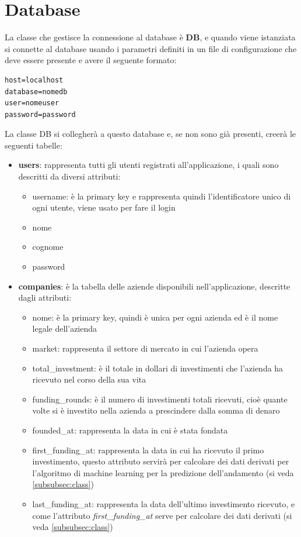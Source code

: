 \section{Database}
La classe che gestisce la connessione al database è \textbf{DB}, e quando viene istanziata si connette al database usando i parametri definiti in un file di configurazione che deve essere presente e avere il seguente formato:
\newpage
\begin{verbatim}
host=localhost
database=nomedb
user=nomeuser
password=password
\end{verbatim}
La classe DB si collegherà a questo database e, se non sono già presenti, creerà le seguenti tabelle:
\begin{itemize}
\item \textbf{users}: rappresenta tutti gli utenti registrati all'applicazione, i quali sono descritti da diversi attributi:
\begin{itemize}
\item username: è la primary key e rappresenta quindi l'identificatore unico di ogni utente, viene usato per fare il login
\item nome
\item cognome
\item password
\end{itemize}
\item \textbf{companies}: è la tabella delle aziende disponibili nell'applicazione, descritte dagli attributi:
\begin{itemize}
\item nome: è la primary key, quindi è unica per ogni azienda ed è il nome legale dell'azienda
\item market: rappresenta il settore di mercato in cui l'azienda opera
\item total\_investment: è il totale in dollari di investimenti che l'azienda ha ricevuto nel corso della sua vita
\item funding\_rounds: è il numero di investimenti totali ricevuti, cioè quante volte si è investito nella azienda a prescindere dalla somma di denaro
\item founded\_at: rappresenta la data in cui è stata fondata
\item first\_funding\_at: rappresenta la data in cui ha ricevuto il primo investimento, questo attributo servirà per calcolare dei dati derivati per l'algoritmo di machine learning per la predizione dell'andamento (si veda \ref{subsubsec:class})
\item last\_funding\_at: rappresenta la data dell'ultimo investimento ricevuto, e come l'attributo \textit{first\_funding\_at} serve per calcolare dei dati derivati (si veda \ref{subsubsec:class})

\end{itemize}
\end{itemize}
